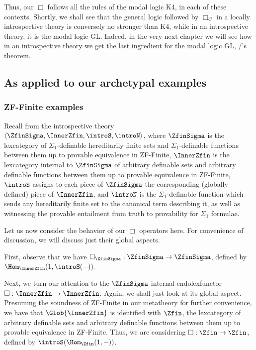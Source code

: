 Thus, our $\Box$ follows all the rules of the modal logic K4, in each of these contexts. Shortly, we shall see that the general logic followed by $\Box_C$ in a locally introspective theory is conversely no stronger than K4, while in an introspective theory, it is the modal logic GL. Indeed, in the very next chapter we will see how in an introspective theory we get the last ingredient for the modal logic GL, \Loeb/'s theorem.



\subsection{As applied to our archetypal examples}

\subsubsection{ZF-Finite examples}
Recall from  the introspective theory $\langle \ZfinSigma, \InnerZfin, \introS, \introN \rangle$, where $\ZfinSigma$ is the lexcategory of $\Sigma_1$-definable hereditarily finite sets and $\Sigma_1$-definable functions between them up to provable equivalence in ZF-Finite, $\InnerZfin$ is the lexcategory internal to $\ZfinSigma$ of arbitrary definable sets and arbitrary definable functions between them up to provable equivalence in ZF-Finite, $\introS$ assigns to each piece of $\ZfinSigma$ the corresponding (globally defined) piece of $\InnerZfin$, and $\introN$ is the $\Sigma_1$-definable function which sends any hereditarily finite set to the canonical term describing it, as well as witnessing the provable entailment from truth to provability for $\Sigma_1$ formulae.

Let us now consider the behavior of our $\Box$ operators here. For convenience of discussion, we will discuss just their global aspects.

First, observe that we have $\Box_{\ZfinSigma} : \ZfinSigma \to \ZfinSigma$, defined by $\Hom_{\InnerZfin}(1, \introS(-))$. \TODO

Next, we turn our attention to the $\ZfinSigma$-internal endolexfunctor $\Box : \InnerZfin \to \InnerZfin$. Again, we shall just look at its global aspect. Presuming the soundness of ZF-Finite in our metatheory for further convenience, we have that $\Glob{\InnerZfin}$ is identified with $\Zfin$, the lexcategory of arbitrary definable sets and arbitrary definable functions between them up to provable equivalence in ZF-Finite. Thus, we are considering $\Box : \Zfin \to \Zfin$, defined by $\introS(\Hom_{\Zfin}(1, -))$. \TODO


